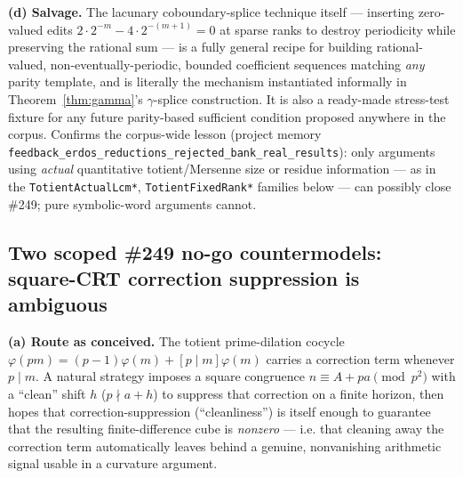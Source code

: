 \textbf{(d) Salvage.} The lacunary coboundary-splice technique itself —
inserting zero-valued edits \(2\cdot2^{-m}-4\cdot2^{-(m+1)}=0\) at sparse
ranks to destroy periodicity while preserving the rational sum — is a fully
general recipe for building rational-valued, non-eventually-periodic,
bounded coefficient sequences matching \emph{any} parity template, and is
literally the mechanism instantiated informally in
Theorem~\ref{thm:gamma}'s \(\gamma\)-splice construction. It is also a
ready-made stress-test fixture for any future parity-based sufficient
condition proposed anywhere in the corpus. Confirms the corpus-wide lesson
(project memory \texttt{feedback\_erdos\_reductions\_rejected\_bank\_real\_results}):
only arguments using \emph{actual} quantitative totient/Mersenne size or
residue information — as in the \texttt{TotientActualLcm*},
\texttt{TotientFixedRank*} families below — can possibly close \#249; pure
symbolic-word arguments cannot.

\subsection{Two scoped \#249 no-go countermodels: square-CRT correction
suppression is ambiguous}

\textbf{(a) Route as conceived.} The totient prime-dilation cocycle
\(\varphi(pm)=(p-1)\varphi(m)+[p\mid m]\varphi(m)\) carries a correction term
whenever \(p\mid m\). A natural strategy imposes a square congruence
\(n\equiv A+pa\pmod{p^2}\) with a ``clean'' shift \(h\) (\(p\nmid a+h\)) to
suppress that correction on a finite horizon, then hopes that
correction-suppression (``cleanliness'') is itself enough to guarantee that
the resulting finite-difference cube is \emph{nonzero} — i.e. that cleaning
away the correction term automatically leaves behind a genuine, nonvanishing
arithmetic signal usable in a curvature argument.

